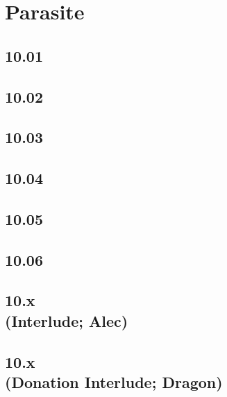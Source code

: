 \part{Parasite}
 \chapter{10.01}
 \chapter{10.02}
 \chapter{10.03}
 \chapter{10.04}
 \chapter{10.05}
 \chapter{10.06}
 \chapter[10.x (Interlude; Alec)]{10.x\\(Interlude; Alec)}
 \chapter[10.x (Donation Interlude; Dragon)]{10.x\\(Donation Interlude; Dragon)}









